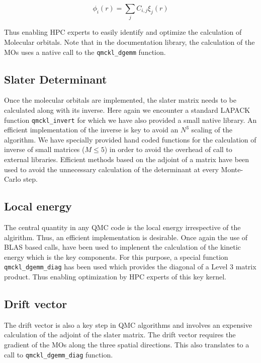 \begin{equation}
  \phi_i(r) = \sum_{j}C_{i,j}\xi_j(r)
\end{equation}

Thus enabling HPC experts to easily identify and optimize the calculation
of Molecular orbitals. Note that in the documentation library, the
calculation of the MOs uses a native call to the \texttt{qmckl_dgemm}
function.

\subsection{Slater Determinant}

Once the molecular orbitals are implemented, the slater matrix needs to be
calculated along with its inverse. Here again we encounter a standard
\ac{LAPACK} function \texttt{qmckl_invert} for which we have also
provided a small native library. An efficient implementation of the inverse is
key to avoid an $N^3$ scaling of the algorithm. We have specially provided hand
coded functions for the calculation of inverse of small matrices ($M\le 5$) in
order to avoid the overhead of call to external libraries. Efficient methods
based on the adjoint of a matrix \cite{MCMQC} have been used to avoid the
unnecessary calculation of the determinant at every Monte-Carlo step.

\subsection{Local energy}

The central quantity in any QMC code is the local energy irrespective of
the algirithm. Thus, an efficient implementation is desirable. Once again
the use of \ac{BLAS} based calls, have been used to implenent the calculation
of the kinetic energy which is the key components. For this purpose, a
special function \texttt{qmckl_dgemm_diag} has been used which
provides the diagonal of a Level 3 matrix product. Thus enabling optimization
by HPC experts of this key kernel.

\subsection{Drift vector}

The drift vector is also a key step in \ac{QMC} algorithms and
involves an expensive calculation of the adjoint of the slater matrix.
The drift vector requires the gradient of the MOs along the three
spatial directions. This also translates to a call to \texttt{qmckl_dgemm_diag} function.



